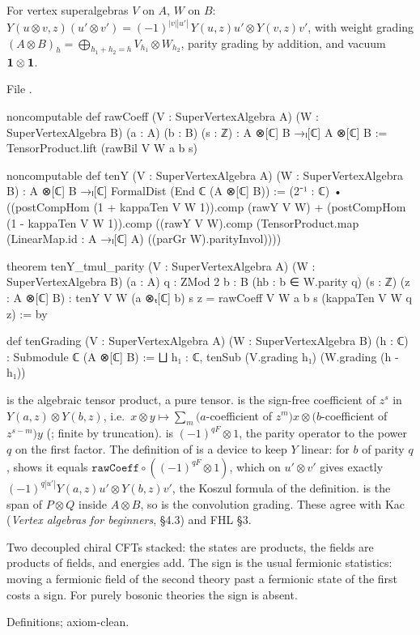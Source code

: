 \begin{definition}\label{l04:def:tenY}
For vertex superalgebras $V$ on $A$, $W$ on $B$:
$Y(u\otimes v,z)(u'\otimes v') = (-1)^{|v||u'|}\,Y(u,z)u'\otimes Y(v,z)v'$, with weight grading
$(A\otimes B)_h = \bigoplus_{h_1+h_2 = h}V_{h_1}\otimes W_{h_2}$, parity grading by addition, and
vacuum $\mathbf{1}\otimes\mathbf{1}$.
\end{definition}
\noindent File .
\begin{leancode}
noncomputable def rawCoeff (V : SuperVertexAlgebra A) (W : SuperVertexAlgebra B) (a : A) (b : B)
    (s : ℤ) : A ⊗[ℂ] B →ₗ[ℂ] A ⊗[ℂ] B :=
  TensorProduct.lift (rawBil V W a b s)

noncomputable def tenY (V : SuperVertexAlgebra A) (W : SuperVertexAlgebra B) :
    A ⊗[ℂ] B →ₗ[ℂ] FormalDist (End ℂ (A ⊗[ℂ] B)) :=
  (2⁻¹ : ℂ) •
    ((postCompHom (1 + kappaTen V W 1)).comp (rawY V W)
      + (postCompHom (1 - kappaTen V W 1)).comp
          ((rawY V W).comp
            (TensorProduct.map (LinearMap.id : A →ₗ[ℂ] A) ((parGr W).parityInvol))))

theorem tenY_tmul_parity (V : SuperVertexAlgebra A) (W : SuperVertexAlgebra B) (a : A)
    {q : ZMod 2} {b : B} (hb : b ∈ W.parity q) (s : ℤ) (z : A ⊗[ℂ] B) :
    tenY V W (a ⊗ₜ[ℂ] b) s z = rawCoeff V W a b s (kappaTen V W q z) := by

def tenGrading (V : SuperVertexAlgebra A) (W : SuperVertexAlgebra B) (h : ℂ) :
    Submodule ℂ (A ⊗[ℂ] B) :=
  ⨆ h₁ : ℂ, tenSub (V.grading h₁) (W.grading (h - h₁))
\end{leancode}
\begin{dictionary}
 is the algebraic tensor product,  a pure tensor. 
is the sign-free coefficient of $z^s$ in $Y(a,z)\otimes Y(b,z)$, i.e.\ $x\otimes y\mapsto\sum_m
(a$-coefficient of $z^m)x\otimes(b$-coefficient of $z^{s-m})y$ (; finite by
truncation).  is $(-1)^{qF}\otimes1$, the parity operator to the power $q$ on the
first factor. The definition of  is a device to keep $Y$ linear: for $b$ of parity $q$,
\allowbreak{}\allowbreak{} shows it equals $\mathtt{rawCoeff}\circ((-1)^{qF}\otimes1)$, which on
$u'\otimes v'$ gives exactly $(-1)^{q|u'|}Y(a,z)u'\otimes Y(b,z)v'$, the Koszul formula of the
definition.  is the span of $P\otimes Q$ inside $A\otimes B$, so  is
the convolution grading. These agree with Kac (\emph{Vertex algebras for beginners}, §4.3) and FHL §3.
\end{dictionary}
\begin{physics}
Two decoupled chiral CFTs stacked: the states are products, the fields are products of fields, and
energies add. The sign is the usual fermionic statistics: moving a fermionic field of the second
theory past a fermionic state of the first costs a sign. For purely bosonic theories the sign is
absent.
\end{physics}
\begin{status}
Definitions; axiom-clean.
\end{status}

